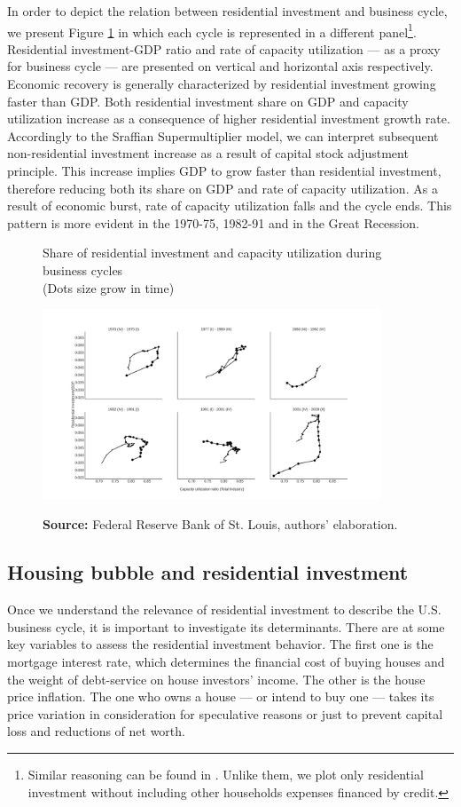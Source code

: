 \documentclass[12pt]{article}
\begin{document}
In order to depict the relation between residential investment and business cycle, we present Figure \ref{fig:cycles} in which each cycle is represented in a different panel\footnote{Similar reasoning can be found in \textcite{fiebiger_trend_2017}. Unlike them, we plot only residential investment without including other households expenses financed by credit.}.
Residential investment-GDP ratio and rate of capacity utilization --- as a proxy for business cycle --- are presented on vertical and horizontal axis respectively.
Economic recovery is generally characterized by residential investment growing faster than GDP. Both residential investment share on GDP and capacity utilization increase as a consequence of higher residential investment growth rate.
Accordingly to the Sraffian Supermultiplier model, we can interpret subsequent non-residential investment increase as a result of capital stock adjustment principle. 
This increase implies GDP to grow faster than residential investment, therefore reducing both its share on GDP and rate of capacity utilization.
As a result of economic burst, rate of capacity utilization falls and the cycle ends.
This pattern is more evident in the 1970-75, 1982-91 and in the Great Recession.


\begin{figure}[htb]
    \centering
        \caption{Share of residential investment and capacity utilization during business cycles\\\centering (Dots size grow in  time)} 
    \includegraphics[width = 0.9\textwidth]{./figs/cycles.png}
    \label{fig:cycles}
    \caption*{\textbf{Source:} Federal Reserve Bank of St. Louis, authors’ elaboration.}
\end{figure}

\subsection{Housing bubble and residential investment}
\label{sec:org0be901e}
\label{sec_own}
Once we understand the relevance of residential investment to describe the U.S. business cycle, it is important to investigate its determinants.
There are at some key variables to assess the residential investment behavior.
The first one is the mortgage interest rate, which determines the financial cost of buying houses and the weight of debt-service on house investors' income.
The other is the house price inflation.
The one who owns a house --- or intend to buy one --- takes its price variation in consideration for speculative reasons or just to prevent capital loss and reductions of net worth.
\end{document}
